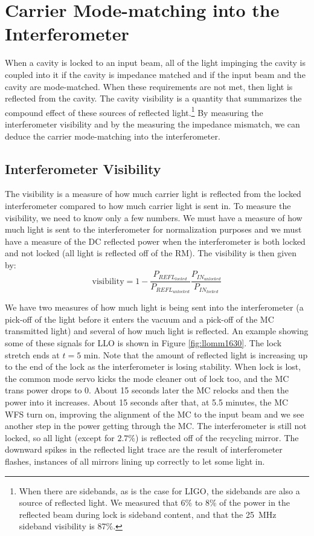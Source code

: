 \section{Carrier Mode-matching into the Interferometer}
\label{sec:MM}
When a cavity is locked to an input beam, all of the light impinging
the cavity is coupled into it if the cavity is impedance matched and
if the input beam and the cavity are mode-matched. When these
requirements are not met, then light is reflected from the cavity. The
cavity visibility is a quantity that summarizes the compound effect of
these sources of reflected light.\footnote{When there are sidebands,
  as is the case for LIGO, the sidebands are also a source of
  reflected light. We measured that 6\% to 8\% of the power in the
  reflected beam during lock is sideband content, and that the 25~MHz
  sideband visibility is 87\%.} By measuring the interferometer
visibility and by the measuring the impedance mismatch, we can deduce
the carrier mode-matching into the interferometer.


\subsection{Interferometer Visibility}
The visibility is a measure of how much carrier light is reflected
from the locked interferometer compared to how much carrier light is
sent in.  To measure the visibility, we need to know only a few
numbers. We must have a measure of how much light is sent to the
interferometer for normalization purposes and we must have a measure
of the DC reflected power when the interferometer is both locked and
not locked (all light is reflected off of the RM). The visibility is
then given by:
\begin{equation}
\mbox{visibility} = 1 -
\frac{P_{REFL_{locked}}}{P_{REFL_{unlocked}}} \frac{P_{IN_{unlocked}}}{P_{IN_{locked}}}
\end{equation}

We have two measures of how much light is being sent into the
interferometer (a pick-off of the light before it enters the vacuum
and a pick-off of the MC transmitted light) and several of how much
light is reflected. An example showing some of these signals for LLO
is shown in Figure \ref{fig:llomm1630}. The lock stretch ends at $t=5$
min. Note that the amount of reflected light is increasing up to the
end of the lock as the interferometer is losing stability. When lock
is lost, the common mode servo kicks the mode cleaner out of lock too,
and the MC trans power drops to 0. About 15 seconds later the MC
relocks and then the power into it increases. About 15 seconds after
that, at 5.5 minutes, the MC WFS turn on, improving the alignment of
the MC to the input beam and we see another step in the power getting
through the MC. The interferometer is still not locked, so all light
(except for $2.7\%$) is reflected off of the recycling mirror. The
downward spikes in the reflected light trace are the result of
interferometer flashes, instances of all mirrors lining up correctly
to let some light in.

